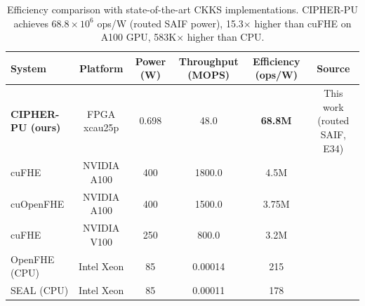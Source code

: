 \begin{table}[htbp]
\centering
\caption{Efficiency comparison with state-of-the-art CKKS implementations.
CIPHER-PU achieves $68.8\times10^6$ ops/W (routed SAIF power), 15.3$\times$ higher than cuFHE on A100 GPU,
583K$\times$ higher than CPU.}
\label{tab:sota}
\footnotesize
\begin{tabular}{lccccc}
\toprule
System & Platform & Power (W) & Throughput (MOPS) & Efficiency (ops/W) & Source \\
\midrule
\textbf{CIPHER-PU (ours)} & FPGA xcau25p & 0.698 & 48.0   & \textbf{68.8M} & This work (routed SAIF, E34) \\
cuFHE            & NVIDIA A100  & 400  & 1800.0 & 4.5M   & \cite{frigg2022cufhe} \\
cuOpenFHE        & NVIDIA A100  & 400  & 1500.0 & 3.75M  & \cite{openfhe} \\
cuFHE            & NVIDIA V100  & 250  & 800.0  & 3.2M   & \cite{frigg2022cufhe} \\
OpenFHE (CPU)    & Intel Xeon   & 85   & 0.00014 & 215   & \cite{openfhe} \\
SEAL (CPU)       & Intel Xeon   & 85   & 0.00011 & 178   & \cite{openfhe} \\
\bottomrule
\end{tabular}
\end{table}